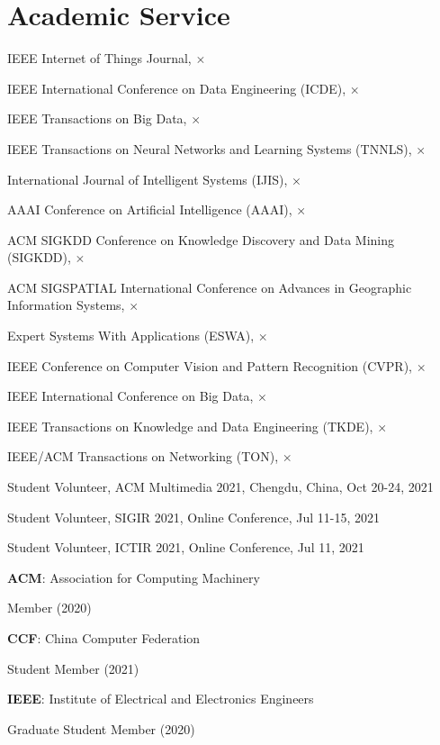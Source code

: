 \section*{Academic Service}


\indent

IEEE Internet of Things Journal, $\times$

IEEE International Conference on Data Engineering (ICDE), $\times$

IEEE Transactions on Big Data, $\times$

IEEE Transactions on Neural Networks and Learning Systems (TNNLS), $\times$

International Journal of Intelligent Systems (IJIS), $\times$

AAAI Conference on Artificial Intelligence (AAAI), $\times$

ACM SIGKDD Conference on Knowledge Discovery and Data Mining (SIGKDD), $\times$

ACM SIGSPATIAL International Conference on Advances in Geographic Information Systems, $\times$

Expert Systems With Applications (ESWA), $\times$

IEEE Conference on Computer Vision and Pattern Recognition (CVPR), $\times$

IEEE International Conference on Big Data, $\times$

IEEE Transactions on Knowledge and Data Engineering (TKDE), $\times$

IEEE/ACM Transactions on Networking (TON), $\times$

\indent 

Student Volunteer, ACM Multimedia 2021, Chengdu, China, Oct 20-24, 2021

Student Volunteer, SIGIR 2021, Online Conference, Jul 11-15, 2021

Student Volunteer, ICTIR 2021, Online Conference, Jul 11, 2021

\indent 

\textbf{ACM}: Association for Computing Machinery 

\hspace{2em}Member (2020)

\textbf{CCF}: China Computer Federation

\hspace{2em}Student Member (2021)

\textbf{IEEE}: Institute of Electrical and Electronics Engineers

\hspace{2em}Graduate Student Member (2020)